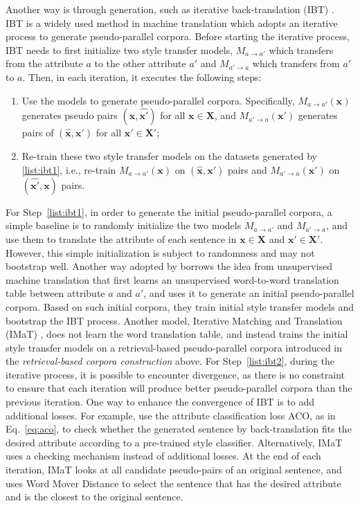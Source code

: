 Another way is through generation, such as iterative back-translation (IBT) . IBT is a widely used method in machine translation  which adopts an iterative process to generate pseudo-parallel corpora. 
Before starting the iterative process, IBT needs to first initialize two style transfer models, $M_{a \rightarrow a'}$ which transfers from the attribute $a$ to the other attribute $a'$ and $M_{a' \rightarrow a}$ which transfers from $a'$ to $a$. 
Then, in each iteration, it executes the following steps:
\begin{enumerate}[align=left, 
leftmargin=*,
label=Step \arabic*), ref=\arabic*]
    \item Use the models to generate pseudo-parallel corpora. Specifically, $M_{a \rightarrow a'}(\bm{x})$ generates pseudo pairs $(\bm{x}, \widehat{\bm{x}'})$  for all $\bm{x} \in \bm{X}$,
    and $M_{a' \rightarrow a}(\bm{x}')$ generates pairs of $(\widehat{\bm{x}}, \bm{x}')$ for all $\bm{x}' \in \bm{X}'$;
    \label{list:ibt1}
    \item Re-train these two style transfer models on the datasets generated by \ref{list:ibt1}, i.e., re-train $M_{a \rightarrow a'}(\bm{x})$ on $(  \widehat{\bm{x}}, \bm{x}')$ pairs and $M_{a' \rightarrow a}(\bm{x}')$ on $(\widehat{\bm{x}'}, \bm{x})$ pairs.
    \label{list:ibt2}
\end{enumerate}
For Step~\ref{list:ibt1}, in order to generate the initial pseudo-parallel corpora, a simple baseline is to randomly initialize the two models $M_{a \rightarrow a'}$ and
$M_{a' \rightarrow a}$, and use them to translate the attribute of each sentence in $\bm{x} \in \bm{X}$ and $\bm{x}' \in \bm{X}'$. However, this simple initialization is subject to randomness and may not bootstrap well. Another way adopted by  borrows the idea from unsupervised machine translation  that first learns an unsupervised word-to-word translation table between attribute $a$ and $a'$, and uses it to generate an initial
pseudo-parallel corpora. Based on such initial corpora, they train initial style transfer models and bootstrap the IBT process.
Another model, Iterative Matching and Translation (IMaT) , does not learn the word translation table, and instead trains the initial style transfer models on a retrieval-based pseudo-parallel corpora introduced in the \textit{retrieval-based corpora construction} above.
For Step~\ref{list:ibt2}, during the iterative process, it is possible to encounter divergence, as there is no constraint to ensure that each iteration will produce better pseudo-parallel corpora than the previous iteration.
One way to enhance the convergence of IBT is to add additional losses. For example,  use the attribute classification loss ACO, as in Eq.~\eqref{eq:aco}, to check whether the generated sentence by back-translation fits the desired attribute according to a pre-trained style classifier.
Alternatively, IMaT  uses a checking mechanism instead of additional losses. At the end of each iteration, IMaT looks at all candidate pseudo-pairs of an original sentence, and uses Word Mover Distance  to select the sentence that has the desired attribute and is the closest to the original sentence.

